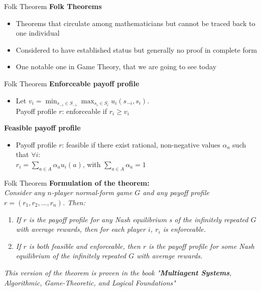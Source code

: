 



\begin{frame}{Folk Theorem}
    \textbf{Folk Theorems}
    \begin{itemize}
        \item Theorems that circulate among mathematicians but cannot be traced back to one individual
        \item Considered to have established status but generally no proof in complete form
        \item One notable one in Game Theory, that we are going to see today
    \end{itemize}
\end{frame}

\begin{frame}{Folk Theorem}
    \textbf{Enforceable payoff profile}
    \begin{itemize}
        \item Let $v_i= \min_{s_{-i}\in S_{-i}} \max_{s_{i}\in S_{i}} u_i(s_{-i},s_i)$.\\
        Payoff profile $r$: enforceable if $r_i\geq v_i$
    \end{itemize}
    \textbf{Feasible payoff profile}
    \begin{itemize}
        \item Payoff profile $r$: feasible if there exist rational, non-negative values $\alpha_a$ such that $\forall i$:\\
        $r_i=\sum_{a\in A} \alpha_a u_i(a)$, with $\sum_{a\in A} \alpha_a=1 $
    \end{itemize}
\end{frame}



\begin{frame}{Folk Theorem}
    \textbf{Formulation of the theorem:}\\
    \textit{Consider any $n$-player normal-form game $G$ and any payoff profile $r = (r_1,r_2,...,r_n)$. Then:}
    \begin{enumerate}
        \item \textit{If $r$ is the payoff profile for any Nash equilibrium s of the infinitely repeated $G$ with average rewards, then for each player $i$, $r_i$ is enforceable.}
        \item \textit{If $r$ is both feasible and enforceable, then $r$ is the payoff profile for some Nash equilibrium of the infinitely repeated $G$ with average rewards.}
    \end{enumerate}
    \textit{This version of the theorem is proven in the book "\textbf{Multiagent Systems}, Algorithmic, Game-Theoretic, and Logical Foundations"}
\end{frame}


